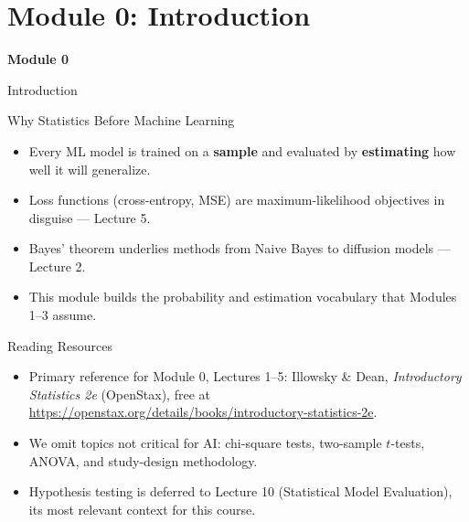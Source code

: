\section{Module 0: Introduction}

\begin{frame}
\vfill
\centering
{\color{RLBlue}\Large\bfseries Module 0}

\vspace{0.6em}
{\Large Introduction}
\vfill
\end{frame}


\begin{frame}{Why Statistics Before Machine Learning}
\begin{itemize}
  \item Every ML model is trained on a \textbf{sample} and evaluated by \textbf{estimating} how well it will generalize.
  \pause
  \item Loss functions (cross-entropy, MSE) are maximum-likelihood objectives in disguise --- Lecture 5.
  \pause
  \item Bayes' theorem underlies methods from Naive Bayes to diffusion models --- Lecture 2.
  \pause
  \item This module builds the probability and estimation vocabulary that Modules 1--3 assume.
\end{itemize}
\end{frame}

\begin{frame}{Reading Resources}
\begin{itemize}
  \item Primary reference for Module 0, Lectures 1--5: Illowsky \& Dean, \textit{Introductory Statistics 2e} (OpenStax), free at \url{https://openstax.org/details/books/introductory-statistics-2e}.
  \pause
  \item We omit topics not critical for AI: chi-square tests, two-sample $t$-tests, ANOVA, and study-design methodology.
  \pause
  \item Hypothesis testing is deferred to Lecture 10 (Statistical Model Evaluation), its most relevant context for this course.
\end{itemize}
\end{frame}
